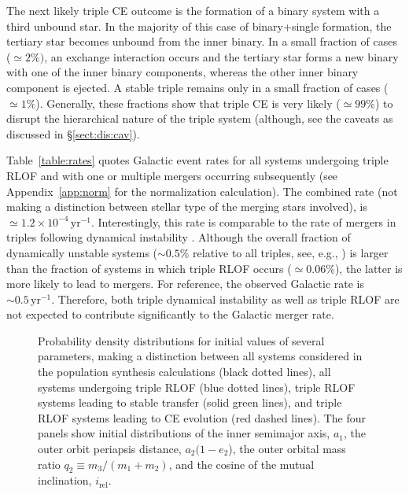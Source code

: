 \documentclass[twocolumn,appendixfloats,tighten]{aastex631}
\newcommand{\yr}{\mathrm{yr}}
\begin{document}
The next likely triple CE outcome is the formation of a binary system with a third unbound star. In the majority of this case of binary+single formation, the tertiary star becomes unbound from the inner binary. In a small fraction of cases ($\simeq 2\%)$, an exchange interaction occurs and the tertiary star forms a new binary with one of the inner binary components, whereas the other inner binary component is ejected. A stable triple remains only in a small fraction of cases ($\simeq 1 \%$). Generally, these fractions show that triple CE is very likely ($\simeq 99\%$) to disrupt the hierarchical nature of the triple system (although, see the caveats as discussed in \S\ref{sect:dis:cav}). 

Table~\ref{table:rates} quotes Galactic event rates for all systems undergoing triple RLOF and with one or multiple mergers occurring subsequently (see Appendix~\ref{app:norm} for the normalization calculation). The combined rate (not making a distinction between stellar type of the merging stars involved), is $\simeq 1.2 \times 10^{-4} \, \yr^{-1}$. Interestingly, this rate is comparable to the rate of mergers in triples following dynamical instability \citep{2012ApJ...760...99P,2021arXiv210713620H,2021arXiv210804272T}. Although the overall fraction of dynamically unstable systems ($\sim 0.5\%$ relative to all triples, see, e.g., \citealt{2021arXiv210713620H}) is larger than the fraction of systems in which triple RLOF occurs ($\simeq 0.06\%$), the latter is more likely to lead to mergers. For reference, the observed Galactic rate \citep{2014MNRAS.443.1319K} is $\sim 0.5 \, \yr^{-1}$. Therefore, both triple dynamical instability as well as triple RLOF are not expected to contribute significantly to the Galactic merger rate. 


\begin{figure*}
\iftoggle{ApJFigs}{
\texttt{[image: a1s]}
\texttt{[image: a2s]}
\texttt{[image: q2s]}
\texttt{[image: i\_rels]}
}{
\texttt{[image: figs/a1s]}
\texttt{[image: figs/a2s]}
\texttt{[image: figs/q2s]}
\texttt{[image: figs/i\_rels]}
}
\caption{Probability density distributions for initial values of several parameters, making a distinction between all systems considered in the population synthesis calculations (black dotted lines), all systems undergoing triple RLOF (blue dotted lines), triple RLOF systems leading to stable transfer (solid green lines), and triple RLOF systems leading to CE evolution (red dashed lines). The four panels show initial distributions of the inner semimajor axis, $a_1$, the outer orbit periapsis distance, $a_2(1-e_2$), the outer orbital mass ratio $q_2 \equiv m_3/(m_1+m_2)$, and the cosine of the mutual inclination, $i_\mathrm{rel}$.  }
\label{fig:trlof_ICs}
\end{figure*}
\end{document}
